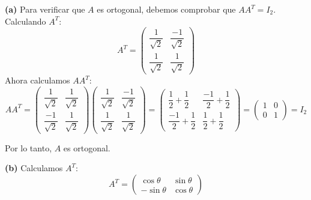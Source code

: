\begin{myproof} \textbf{(a)} Para verificar que $A$ es ortogonal, debemos comprobar que $AA^T = I_2$. Calculando $A^T$:
$$A^T = \begin{pmatrix} \dfrac{1}{\sqrt{2}}&\dfrac{-1}{\sqrt{2}}\\\dfrac{1}{\sqrt{2}}&\dfrac{1}{\sqrt{2}}\end{pmatrix}$$
Ahora calculamos $AA^T$:
$$AA^T = \begin{pmatrix} \dfrac{1}{\sqrt{2}}&\dfrac{1}{\sqrt{2}}\\\dfrac{-1}{\sqrt{2}}&\dfrac{1}{\sqrt{2}}\end{pmatrix} \begin{pmatrix} \dfrac{1}{\sqrt{2}}&\dfrac{-1}{\sqrt{2}}\\\dfrac{1}{\sqrt{2}}&\dfrac{1}{\sqrt{2}}\end{pmatrix}= \begin{pmatrix} \dfrac{1}{2}+\dfrac{1}{2} & \dfrac{-1}{2}+\dfrac{1}{2}\\\dfrac{-1}{2}+\dfrac{1}{2} & \dfrac{1}{2}+\dfrac{1}{2}\end{pmatrix} = \begin{pmatrix} 1 & 0\\0 & 1\end{pmatrix} = I_2$$

Por lo tanto, $A$ es ortogonal.

\textbf{(b)} Calculamos $A^T$:
$$A^T = \begin{pmatrix} \cos\theta & \sin\theta\\-\sin\theta&\cos\theta \end{pmatrix}$$


\end{myproof}
